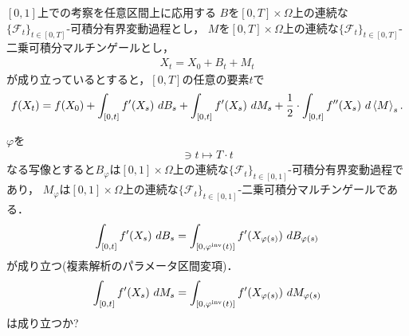 	\begin{itembox}[l]{$[0,1]$上での考察を任意区間上に応用する}
		$B$を$[0,T] \times \Omega$上の連続な$\{\mathscr{F}_{t}\}_{t \in [0,T]}$-可積分有界変動過程とし，
		$M$を$[0,T] \times \Omega$上の連続な$\{\mathscr{F}_{t}\}_{t \in [0,T]}$-二乗可積分マルチンゲールとし，
		\begin{align}
			X_{t} = X_{0} + B_{t} + M_{t}
		\end{align}
		が成り立っているとすると，$[0,T]$の任意の要素$t$で
		\begin{align}
			f(X_{t}) = f(X_{0}) + \int_{[0,t]} f'(X_{s})\ dB_{s} + \int_{[0,t]} f'(X_{s})\ dM_{s}
			+ \frac{1}{2} \cdot \int_{[0,t]} f''(X_{s})\ d\inprod<M>_{s}.
		\end{align}
	\end{itembox}
	
	$\varphi$を
	\begin{align}
		[0,1] \ni t \longmapsto T \cdot t
	\end{align}
	なる写像とすると$B_{\varphi}$は$[0,1] \times \Omega$上の連続な$\{\mathscr{F}_{t}\}_{t \in [0,1]}$-可積分有界変動過程であり，
	$M_{\varphi}$は$[0,1] \times \Omega$上の連続な$\{\mathscr{F}_{t}\}_{t \in [0,1]}$-二乗可積分マルチンゲールである．
	\begin{align}
		\int_{[0,t]} f'(X_{s})\ dB_{s} = \int_{[0,\varphi^{\operatorname{inv}}(t)]} f'(X_{\varphi(s)})\ dB_{\varphi(s)}
	\end{align}
	が成り立つ(複素解析のパラメータ区間変項)．
	\begin{align}
		\int_{[0,t]} f'(X_{s})\ dM_{s} = \int_{[0,\varphi^{\operatorname{inv}}(t)]} f'(X_{\varphi(s)})\ dM_{\varphi(s)}
	\end{align}
	は成り立つか?